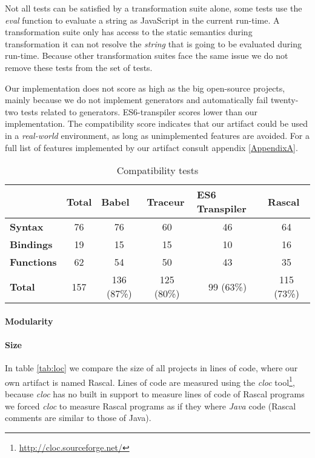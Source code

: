 Not all tests can be satisfied by a transformation suite alone, some tests use the \textit{eval} function to evaluate a string as JavaScript in the current run-time. A transformation suite only has access to the static semantics during transformation it can not resolve the \textit{string} that is going to be evaluated during run-time. Because other transformation suites face the same issue we do not remove these tests from the set of tests. 

Our implementation does not score as high as the big open-source projects, mainly because we do not implement generators and automatically fail twenty-two tests related to generators. ES6-transpiler scores lower than our implementation. The compatibility score indicates that our artifact could be used in a \textit{real-world} environment, as long as unimplemented features are avoided. For a full list of features implemented by our artifact consult appendix \ref{AppendixA}.

\begin{table}[h]
\centering
\caption{Compatibility tests} \label{tab:compatibility}
\begin{tabular}{@{}lccccc@{}}
\toprule
                & {\bf Total} & \multicolumn{1}{l}{{\bf Babel}} & \multicolumn{1}{l}{{\bf Traceur}} & \multicolumn{1}{l}{{\bf ES6 Transpiler}} & \multicolumn{1}{l}{{\bf Rascal}} \\ \midrule
{\bf Syntax}    & 76          & 76                              & 60                     & 46           & 64                               \\
{\bf Bindings}  & 19          & 15                              & 15                     & 10           & 16                               \\
{\bf Functions} & 62          & 54                              & 50                     & 43           & 35                               \\
{\bf Total}     & 157         & 136 (87\%)                      & 125 (80\%)             & 99 (63\%)    & 115 (73\%)                        \\ \bottomrule
\end{tabular}
\end{table}

\paragraph{Modularity}

\paragraph{Size}
In table \ref{tab:loc} we compare the size of all projects in lines of code, where our own artifact is named Rascal. Lines of code are measured using the \textit{cloc} tool\footnote{\url{http://cloc.sourceforge.net/}}, because \textit{cloc} has no built in support to measure lines of code of Rascal programs we forced \textit{cloc} to measure Rascal programs as if they where \textit{Java} code (Rascal comments are similar to those of Java).

